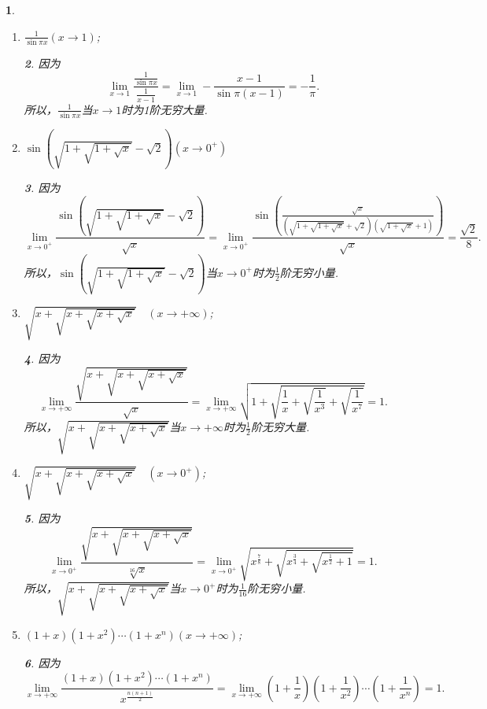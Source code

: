 \documentclass[utf8]{book}
\newtheorem{example}{}[section]             %
\newtheorem{solution}{}
\begin{document}
\begin{example}
\begin{enumerate}
\begin{solution}因为
$$\displaystyle\lim_{x\to +\infty}\frac{2x^5}{x^2(x^3-3x+1)}=2.$$
所以，$\displaystyle\frac{2x^5}{x^3-3x+1}$当$x\to +\infty$时为2阶无穷大量.
\end{solution}
\item $\displaystyle\frac{1}{\sin{\pi x}}(x\to 1)$;
\begin{solution}因为
$$\displaystyle\lim_{x\to 1}\frac{\displaystyle\frac{1}{\sin{\pi x}}}{\displaystyle\frac{1}{x-1}}=\displaystyle\lim_{x\to 1}-\frac{x-1}{\sin{\pi(x-1)}}=-\frac{1}{\pi}.$$
所以，$\displaystyle\frac{1}{\sin{\pi x}}$当$x\to 1$时为1阶无穷大量.
\end{solution}
\item $\sin\left(\sqrt{1+\sqrt{1+\sqrt{x}}}-\sqrt{2}\right)(x\to 0^+)$
\begin{solution}因为
$$\displaystyle\lim_{x\to 0^+}\frac{\sin\left(\sqrt{1+\sqrt{1+\sqrt{x}}}-\sqrt{2}\right)}{\sqrt{x}}=\displaystyle\lim_{x\to 0^+}\frac{\sin\left(\frac{\sqrt{x}}{\left(\sqrt{1+\sqrt{1+\sqrt{x}}}+\sqrt{2}\right)\left(\sqrt{1+\sqrt{x}}+1\right)}\right)}{\sqrt{x}}=\frac{\sqrt{2}}{8}.$$
所以，$\sin\left(\sqrt{1+\sqrt{1+\sqrt{x}}}-\sqrt{2}\right)$当$x\to 0^+$时为$\frac{1}{2}$阶无穷小量.
\end{solution}
\item $\displaystyle\sqrt{x+\sqrt{x+\sqrt{x+\sqrt{x}}}}\quad(x\to +\infty)$;
\begin{solution}因为
$$\displaystyle\lim_{x\to +\infty}\frac{\displaystyle\sqrt{x+\sqrt{x+\sqrt{x+\sqrt{x}}}}}{\sqrt{x}}=\displaystyle\lim_{x\to +\infty}\displaystyle\sqrt{1+\sqrt{\frac{1}{x}+\sqrt{\frac{1}{x^3}}+\sqrt{\frac{1}{x^7}}}}=1.$$
所以，$\displaystyle\sqrt{x+\sqrt{x+\sqrt{x+\sqrt{x}}}}$当$x\to +\infty$时为$\frac{1}{2}$阶无穷大量.
\end{solution}
\item $\displaystyle\sqrt{x+\sqrt{x+\sqrt{x+\sqrt{x}}}}\quad(x\to 0^+)$;
\begin{solution}因为
$$\displaystyle\lim_{x\to 0^+}\frac{\displaystyle\sqrt{x+\sqrt{x+\sqrt{x+\sqrt{x}}}}}{\sqrt[16]{x}}=\displaystyle\lim_{x\to 0^+}\displaystyle\sqrt{x^{\frac{7}{8}}+\sqrt{x^{\frac{3}{4}}+\sqrt{x^{\frac{1}{2}}+1}}}=1.$$
所以，$\displaystyle\sqrt{x+\sqrt{x+\sqrt{x+\sqrt{x}}}}$当$x\to 0^+$时为$\frac{1}{16}$阶无穷小量.
\end{solution}
\item $(1+x)(1+x^2)\cdots(1+x^n)(x\to +\infty)$;
\begin{solution}因为
$$\displaystyle\lim_{x\to +\infty}\frac{(1+x)(1+x^2)\cdots(1+x^n)}{x^{\frac{n(n+1)}{2}}}=\displaystyle\lim_{x\to +\infty}\left(1+\frac{1}{x}\right)\left(1+\frac{1}{x^2}\right)\cdots\left(1+\frac{1}{x^n}\right)=1.$$

\end{solution}
\end{enumerate}
\end{example}
\end{document}
